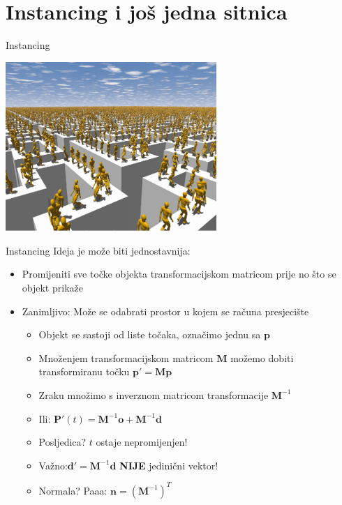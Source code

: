 \documentclass[9pt]{beamer}
\begin{document}
\section{Instancing i još jedna sitnica}
\begin{frame}{Instancing}
	\begin{center}
		\includegraphics[width=0.6\textwidth]{slike/instancing.png}
	\end{center}
\end{frame}

\begin{frame}{Instancing}
	Ideja je može biti jednostavnija:
	\begin{itemize}
		\item Promijeniti sve točke objekta transformacijskom matricom prije no što se objekt prikaže
		\item Zanimljivo: Može se odabrati prostor u kojem se računa presjecište
		\begin{itemize}
			\item Objekt se sastoji od liste točaka, označimo jednu sa $\mathbf{p}$
			\item Množenjem transformacijskom matricom $\mathbf{M}$ možemo dobiti transformiranu točku $\mathbf{p}' = \mathbf{M} \mathbf{p}$
			\item Zraku množimo s inverznom matricom transformacije  $\mathbf{M}^{-1}$
			\item Ili: $\mathbf{P}'(t) = \mathbf{M}^{-1}\mathbf{o} + \mathbf{M}^{-1}\mathbf{d}$
			\item Posljedica? $t$ ostaje nepromijenjen!
			\item Važno:$\mathbf{d}' = \mathbf{M}^{-1}\mathbf{d}$ \textbf{NIJE} jedinični vektor!
			\item Normala? Paaa: $\mathbf{n} = \left(\mathbf{M}^{-1}\right)^T$
		\end{itemize}
	\end{itemize}
\end{frame}
\end{document}
